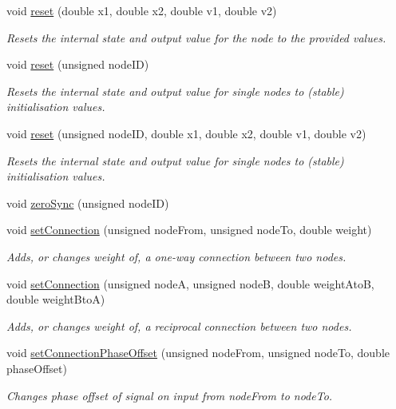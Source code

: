 \begin{DoxyCompactItemize}
void \mbox{\hyperlink{classCPG_a0fcb4e728f2f647cf2af8e4a01223212}{reset}} (double x1, double x2, double v1, double v2)
\begin{DoxyCompactList}\small\item\em Resets the internal state and output value for the node to the provided values. \end{DoxyCompactList}\item 
void \mbox{\hyperlink{classCPG_a0582af7d0c19f80453c9ce72d918e577}{reset}} (unsigned node\+ID)
\begin{DoxyCompactList}\small\item\em Resets the internal state and output value for single nodes to (stable) initialisation values. \end{DoxyCompactList}\item 
void \mbox{\hyperlink{classCPG_a71a46a6aeac8fa3f1363674be5f0db81}{reset}} (unsigned node\+ID, double x1, double x2, double v1, double v2)
\begin{DoxyCompactList}\small\item\em Resets the internal state and output value for single nodes to (stable) initialisation values. \end{DoxyCompactList}\item 
void \mbox{\hyperlink{classCPG_adb0ab0506c07d1b7aa9dd2640c6a1731}{zero\+Sync}} (unsigned node\+ID)
\item 
void \mbox{\hyperlink{classCPG_ae23852907b96b57b7c45a53e9abf3146}{set\+Connection}} (unsigned node\+From, unsigned node\+To, double weight)
\begin{DoxyCompactList}\small\item\em Adds, or changes weight of, a one-\/way connection between two nodes. \end{DoxyCompactList}\item 
void \mbox{\hyperlink{classCPG_a4e79271993dfecd92445e9abfd4be9aa}{set\+Connection}} (unsigned nodeA, unsigned nodeB, double weight\+AtoB, double weight\+BtoA)
\begin{DoxyCompactList}\small\item\em Adds, or changes weight of, a reciprocal connection between two nodes. \end{DoxyCompactList}\item 
void \mbox{\hyperlink{classCPG_ac51f362e189d966e7c733ba1624d0fc1}{set\+Connection\+Phase\+Offset}} (unsigned node\+From, unsigned node\+To, double phase\+Offset)
\begin{DoxyCompactList}\small\item\em Changes phase offset of signal on input from node\+From to node\+To. \end{DoxyCompactList}\item 

\end{DoxyCompactItemize}

